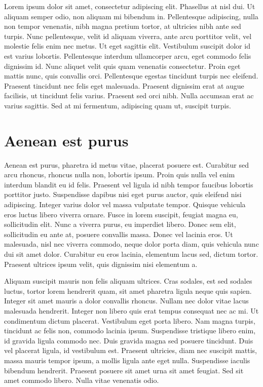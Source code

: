 
\tableofcontents

\newpage


Lorem ipsum dolor sit amet, consectetur adipiscing elit. Phasellus at nisl dui. Ut aliquam semper odio, non aliquam mi bibendum in. Pellentesque adipiscing, nulla non tempor venenatis, nibh magna pretium tortor, at ultricies nibh ante sed turpis. Nunc pellentesque, velit id aliquam viverra, ante arcu porttitor velit, vel molestie felis enim nec metus. Ut eget sagittis elit. Vestibulum suscipit dolor id est varius lobortis. Pellentesque interdum ullamcorper arcu, eget commodo felis dignissim id. Nunc aliquet velit quis quam venenatis consectetur. Proin eget mattis nunc, quis convallis orci. Pellentesque egestas tincidunt turpis nec eleifend. Praesent tincidunt nec felis eget malesuada. Praesent dignissim erat at augue facilisis, ut tincidunt felis varius. Praesent sed orci nibh. Nulla accumsan erat ac varius sagittis. Sed at mi fermentum, adipiscing quam ut, suscipit turpis.

\section{Aenean est purus}

Aenean est purus, pharetra id metus vitae, placerat posuere est. Curabitur sed arcu rhoncus, rhoncus nulla non, lobortis ipsum. Proin quis nulla vel enim interdum blandit eu id felis. Praesent vel ligula id nibh tempor faucibus lobortis porttitor justo. Suspendisse dapibus nisi eget purus auctor, quis eleifend nisi adipiscing. Integer varius dolor vel massa vulputate tempor. Quisque vehicula eros luctus libero viverra ornare. Fusce in lorem suscipit, feugiat magna eu, sollicitudin elit. Nunc a viverra purus, eu imperdiet libero. Donec sem elit, sollicitudin eu ante at, posuere convallis massa. Donec vel lacinia eros. Ut malesuada, nisl nec viverra commodo, neque dolor porta diam, quis vehicula nunc dui sit amet dolor. Curabitur eu eros lacinia, elementum lacus sed, dictum tortor. Praesent ultrices ipsum velit, quis dignissim nisi elementum a.

Aliquam suscipit mauris non felis aliquam ultrices. Cras sodales, est sed sodales luctus, tortor lorem hendrerit quam, sit amet pharetra ligula neque quis sapien. Integer sit amet mauris a dolor convallis rhoncus. Nullam nec dolor vitae lacus malesuada hendrerit. Integer non libero quis erat tempus consequat nec ac mi. Ut condimentum dictum placerat. Vestibulum eget porta libero. Nam magna turpis, tincidunt ac felis non, commodo lacinia ipsum. Suspendisse tristique libero enim, id gravida ligula commodo nec. Duis gravida magna sed posuere tincidunt. Duis vel placerat ligula, id vestibulum est. Praesent ultricies, diam nec suscipit mattis, massa mauris tempor ipsum, a mollis ligula ante eget nulla. Suspendisse iaculis bibendum hendrerit. Praesent posuere sit amet urna sit amet feugiat. Sed sit amet commodo libero. Nulla vitae venenatis odio.

